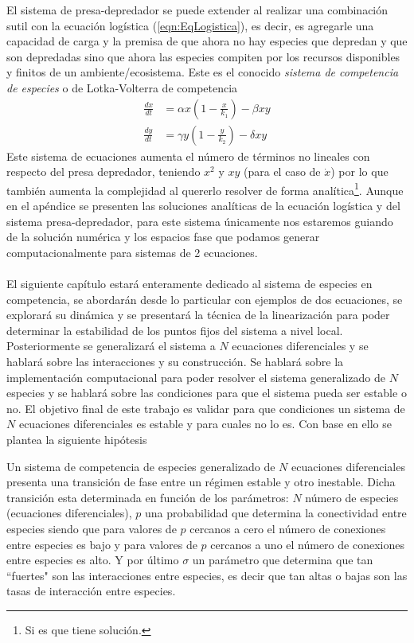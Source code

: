 El sistema de presa-depredador se puede extender al realizar una combinación sutil con la ecuación logística (\ref{eqn:EqLogistica}), es decir, es agregarle una capacidad de carga y la premisa de que ahora no hay especies que depredan y que son depredadas sino que ahora las especies compiten por los recursos disponibles y finitos de un ambiente/ecosistema. Este es el conocido \textit{sistema de competencia de especies} o de Lotka-Volterra de competencia
\begin{equation}\label{eqn:CompentenciaEspecies2x2}
	\begin{split}
		\frac{dx}{dt} &= \alpha x\left (1-\frac{x}{k_1}\right )-\beta xy\\
		\frac{dy}{dt} &= \gamma y\left (1-\frac{y}{k_2}\right )-\delta xy
	\end{split}
\end{equation}
Este sistema de ecuaciones aumenta el número de términos no lineales con respecto del presa depredador, teniendo $x^2$ y $xy$ (para el caso de $\dot{x}$) por lo que también aumenta la complejidad al quererlo resolver de forma analítica\footnote{Si es que tiene solución.}. Aunque en el apéndice se presenten las soluciones analíticas de la ecuación logística y del sistema presa-depredador, para este sistema únicamente nos estaremos guiando de la solución numérica y los espacios fase que podamos generar computacionalmente para sistemas de 2 ecuaciones.\\
\\
El siguiente capítulo estará enteramente dedicado al sistema de especies en competencia, se abordarán desde lo particular con ejemplos de dos ecuaciones, se explorará su dinámica y se presentará la técnica de la linearización para poder determinar la estabilidad de los puntos fijos del sistema a nivel local. Posteriormente se generalizará el sistema a $N$ ecuaciones diferenciales y se hablará sobre las interacciones y su construcción. Se hablará sobre la implementación computacional para poder resolver el sistema generalizado de $N$ especies y se hablará sobre las condiciones para que el sistema pueda ser estable o no. El objetivo final de este trabajo es validar para que condiciones un sistema de $N$ ecuaciones diferenciales es estable y para cuales no lo es. Con base en ello se plantea la siguiente hipótesis
\newpage
\begin{proposición}
	Un sistema de competencia de especies generalizado de $N$ ecuaciones diferenciales presenta una transición de fase entre un régimen estable y otro inestable. Dicha transición esta determinada en función de los parámetros: $N$ número de especies (ecuaciones diferenciales), $p$ una probabilidad que determina la conectividad entre especies siendo que para valores de $p$ cercanos a cero el número de conexiones entre especies es bajo y para valores de $p$ cercanos a uno el número de conexiones entre especies es alto. Y por último $\sigma$ un parámetro que determina que tan ``fuertes" son las interacciones entre especies, es decir que tan altas o bajas son las tasas de interacción entre especies. 
\end{proposición}